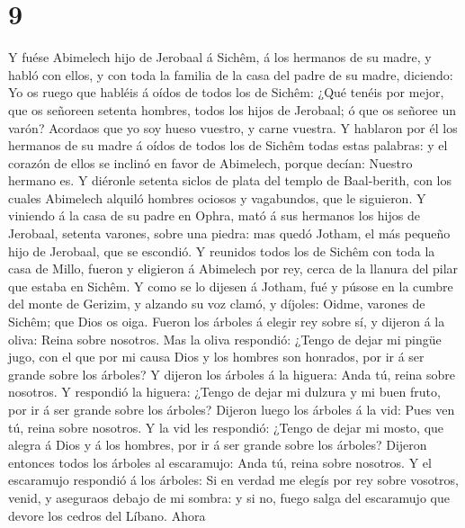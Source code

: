 \hypertarget{section-8}{%
\section{9}\label{section-8}}

 Y fuése Abimelech hijo de Jerobaal á Sichêm, á los
hermanos de su madre, y habló con ellos, y con toda la familia de la
casa del padre de su madre, diciendo:  Yo os ruego que
habléis á oídos de todos los de Sichêm: ¿Qué tenéis por mejor, que os
señoreen setenta hombres, todos los hijos de Jerobaal; ó que os señoree
un varón? Acordaos que yo soy hueso vuestro, y carne vuestra.
 Y hablaron por él los hermanos de su madre á oídos de
todos los de Sichêm todas estas palabras: y el corazón de ellos se
inclinó en favor de Abimelech, porque decían: Nuestro hermano es.
 Y diéronle setenta siclos de plata del templo de
Baal-berith, con los cuales Abimelech alquiló hombres ociosos y
vagabundos, que le siguieron.  Y viniendo á la casa de su
padre en Ophra, mató á sus hermanos los hijos de Jerobaal, setenta
varones, sobre una piedra: mas quedó Jotham, el más pequeño hijo de
Jerobaal, que se escondió.  Y reunidos todos los de Sichêm
con toda la casa de Millo, fueron y eligieron á Abimelech por rey, cerca
de la llanura del pilar que estaba en Sichêm.  Y como se
lo dijesen á Jotham, fué y púsose en la cumbre del monte de Gerizim, y
alzando su voz clamó, y díjoles: Oidme, varones de Sichêm; que Dios os
oiga.  Fueron los árboles á elegir rey sobre sí, y dijeron
á la oliva: Reina sobre nosotros.  Mas la oliva respondió:
¿Tengo de dejar mi pingüe jugo, con el que por mi causa Dios y los
hombres son honrados, por ir á ser grande sobre los árboles?
 Y dijeron los árboles á la higuera: Anda tú, reina sobre
nosotros.  Y respondió la higuera: ¿Tengo de dejar mi
dulzura y mi buen fruto, por ir á ser grande sobre los árboles?
 Dijeron luego los árboles á la vid: Pues ven tú, reina
sobre nosotros.  Y la vid les respondió: ¿Tengo de dejar
mi mosto, que alegra á Dios y á los hombres, por ir á ser grande sobre
los árboles?  Dijeron entonces todos los árboles al
escaramujo: Anda tú, reina sobre nosotros.  Y el
escaramujo respondió á los árboles: Si en verdad me elegís por rey sobre
vosotros, venid, y aseguraos debajo de mi sombra: y si no, fuego salga
del escaramujo que devore los cedros del Líbano.  Ahora
